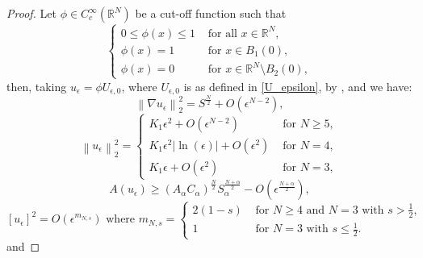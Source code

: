 \documentclass[11pt]{article}
\numberwithin{equation}{section}
\numberwithin{mytheorem}{section}
\begin{document}
		\begin{proof}
			Let $\phi\in C_c^{\infty}(\mathbb{R}^N)$ be a cut-off function such that 
			\begin{equation}\label{4.2}
				\left\{
				\begin{array}{cl}
					0\leq \phi(x) \leq 1 & \text{ for all } x\in \mathbb{R}^N,\\
					\phi (x) = 1 & \text{ for } x\in B_1(0),\\
					\phi(x)=0  & \text{ for } x\in \mathbb{R}^N\setminus B_2(0),
				\end{array}
				\right.
			\end{equation}
			then, taking $u_{\epsilon}=\phi U_{\epsilon,0}$, where $U_{\epsilon,0}$ is as defined in \eqref{U_epsilon}, by \cite[lemma~1.46]{Willem2012Minimax}, \cite[lemma~3.3, eq~3.7]{Cassani2018Choquard} and \cite[lemma~5.3]{da2024MIxed} we have:
			\begin{equation}\label{grad_u_epsilon}
				\left\| \nabla u_{\epsilon}\right\|_2^2 = S^{\frac{N}{2}}+O(\epsilon^{N-2}),
			\end{equation}
			\begin{equation}\label{u_epsilon}
				\left\| u_{\epsilon}\right\|_2^2 = \left\{
				\begin{array}{ll}
					K_1\epsilon^2+O(\epsilon^{N-2}) & \text{ for } N\geq 5,\\
					K_1\epsilon^2|\ln(\epsilon)|+O(\epsilon^2) & \text{ for } N=4,\\
					K_1\epsilon +O(\epsilon^2) & \text{ for } N=3,	
				\end{array}
				\right.
			\end{equation}
			\begin{equation}\label{A(u_epsilon)}
				A(u_{\epsilon}) \geq (A_{\alpha}C_{\alpha})^{\frac{N}{2}}S_{\alpha}^{\frac{N+\alpha}{2}}-O(\epsilon^{\frac{N+\alpha}{2}}),
			\end{equation}
			\begin{equation}\label{[U_epsilon]}
				[u_{\epsilon}]^2 = O(\epsilon^{m_{N,s}}) \text{ where }
				m_{N,s}=\left\{\begin{array}{cl}
					2(1-s) & \text{ for } N\geq 4 \text{ and } N=3 \text{ with } s>\frac{1}{2},\\
					1 & \text{ for } N=3 \text{ with } s\leq\frac{1}{2}.
				\end{array}\right.
			\end{equation}
			and 

\end{proof}
\end{document}
